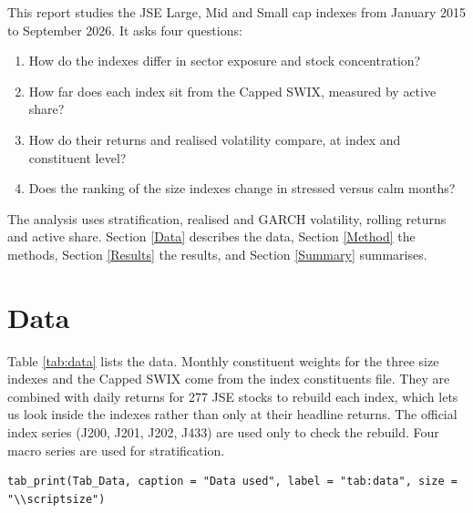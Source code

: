 \documentclass[11pt,preprint]{elsarticle}
\numberwithin{equation}{section}
\numberwithin{figure}{section}
\numberwithin{table}{section}
\def\tightlist{} %
\begin{document}
This report studies the JSE Large, Mid and Small cap indexes from
January 2015 to September 2026. It asks four questions:

\begin{enumerate}
\def\labelenumi{\arabic{enumi}.}
\tightlist
\item
  How do the indexes differ in sector exposure and stock concentration?
\item
  How far does each index sit from the Capped SWIX, measured by active
  share?
\item
  How do their returns and realised volatility compare, at index and
  constituent level?
\item
  Does the ranking of the size indexes change in stressed versus calm
  months?
\end{enumerate}

The analysis uses stratification, realised and GARCH volatility, rolling
returns and active share. Section \ref{Data} describes the data, Section
\ref{Method} the methods, Section \ref{Results} the results, and Section
\ref{Summary} summarises.

\section{\texorpdfstring{Data \label{Data}}{Data }}\label{data}

Table \ref{tab:data} lists the data. Monthly constituent weights for the
three size indexes and the Capped SWIX come from the index constituents
file. They are combined with daily returns for 277 JSE stocks to rebuild
each index, which lets us look inside the indexes rather than only at
their headline returns. The official index series (J200, J201, J202,
J433) are used only to check the rebuild. Four macro series are used for
stratification.

\begin{verbatim}
tab_print(Tab_Data, caption = "Data used", label = "tab:data", size = "\\scriptsize")
\end{verbatim}
\end{document}
